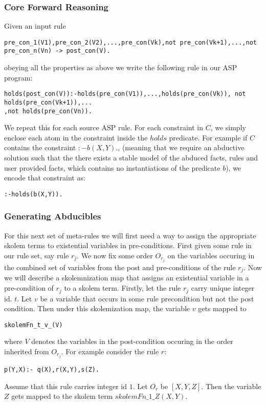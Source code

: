 \documentclass{article}
\begin{document}
\subsubsection{Core Forward Reasoning}
Given an input rule \begin{verbatim}
pre_con_1(V1),pre_con_2(V2),...,pre_con(Vk),not pre_con(Vk+1),...,not pre_con_n(Vn) -> post_con(V).
\end{verbatim} obeying all the properties as above we write the following rule in our ASP program: 
\begin{verbatim}
holds(post_con(V)):-holds(pre_con(V1)),...,holds(pre_con(Vk)), not holds(pre_con(Vk+1)),...
,not holds(pre_con(Vn)). 
\end{verbatim}   
We repeat this for each source ASP rule. For each constraint in $C$, we simply enclose each atom in the constraint inside the $holds$ predicate. For example if $C$ contains the constraint $:-b(X,Y).$, (meaning that we require an abductive solution such that the there exists a stable model of the abduced facts, rules and user provided facts, which contains no instantiations of the predicate $b$), we encode that constraint as:
\begin{verbatim}
:-holds(b(X,Y)).
\end{verbatim}
\subsubsection{Generating Abducibles}
For this next set of meta-rules we will first need a way to assign the appropriate skolem terms to existential variables in pre-conditions. First given some rule in our rule set, say rule $r_{j}$. We now fix some order $O_{r_{j}}$ on the variables occuring in the combined set of variables from the post and pre-conditions of the rule $r_{j}$. Now we will describe a skolemnization map that assigns an existential variable in a pre-condition of $r_{j}$ to a skolem term. Firstly, let the rule $r_{j}$ 
carry unique integer id. $t$. Let $v$ be a variable that occurs in some rule precondition but not the post condition. Then under this skolemization map, the variable $v$ gets mapped to \begin{verbatim}
skolemFn_t_v_(V)    
\end{verbatim}
where $V$ denotes the variables in the post-condition occuring in the order inherited from $O_{r_{j}}$. For example consider the rule $r$: \begin{verbatim}
p(Y,X):- q(X),r(X,Y),s(Z).    
\end{verbatim} 
Assume that this rule carries integer id $1$. Let $O_{r}$ be $[X,Y,Z]$. Then the variable $Z$ gets mapped to the skolem term $skolemFn\_1\_Z(X,Y)$.\\
\newline
\end{document}
